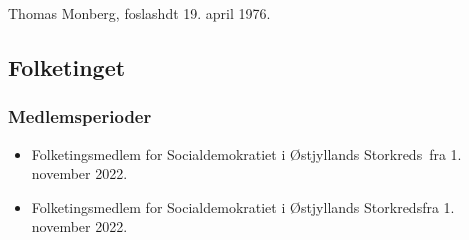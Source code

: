 \documentclass[11pt, a4paper]{awesome-cv}
\begin{document}
\makecvheader[R]
\makelettertitle
\begin{cvletter}
Thomas Monberg, foslashdt 19. april 1976.

\subsection*{Folketinget}
\subsubsection*{Medlemsperioder}
\begin{itemize}
\item Folketingsmedlem for Socialdemokratiet i Østjyllands Storkreds fra 1. november 2022.
\item Folketingsmedlem for Socialdemokratiet i Østjyllands Storkredsfra 1. november 2022.
\end{itemize}
\end{cvletter}
\end{document}
